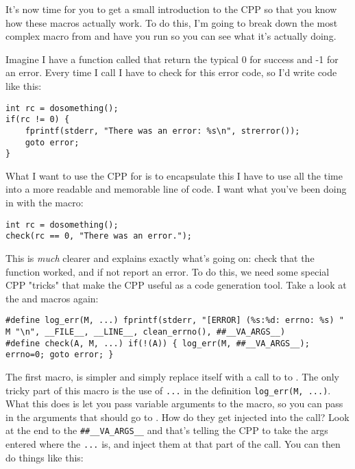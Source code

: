 It's now time for you to get a small introduction to the CPP so that you
know how these macros actually work.  To do this, I'm going to break down
the most complex macro from  and have you run  so
you can see what it's actually doing.

Imagine I have a function called  that return the typical
0 for success and -1 for an error.  Every time I call  I have
to check for this error code, so I'd write code like this:

\begin{lstlisting}
int rc = dosomething();
if(rc != 0) {
    fprintf(stderr, "There was an error: %s\n", strerror());
    goto error;
}
\end{lstlisting}

What I want to use the CPP for is to encapsulate this  I have
to use all the time into a more readable and memorable line of code.  I want
what you've been doing in  with the  macro:

\begin{lstlisting}
int rc = dosomething();
check(rc == 0, "There was an error.");
\end{lstlisting}

This is \emph{much} clearer and explains exactly what's going on: check that the 
function worked, and if not report an error.  To do this, we need some special
CPP "tricks" that make the CPP useful as a code generation tool.  Take a look
at the  and  macros again:

\begin{lstlisting}
#define log_err(M, ...) fprintf(stderr, "[ERROR] (%s:%d: errno: %s) " M "\n", __FILE__, __LINE__, clean_errno(), ##__VA_ARGS__)
#define check(A, M, ...) if(!(A)) { log_err(M, ##__VA_ARGS__); errno=0; goto error; }
\end{lstlisting}

The first macro,  is simpler and simply replace itself with a
call to  to .  The only tricky part of this macro
is the use of \verb|...| in the definition \verb|log_err(M, ...)|.  What this
does is let you pass variable arguments to the macro, so you can pass in the
arguments that should go to .  How do they get injected into the
 call?  Look at the end to the \verb|##__VA_ARGS__| and
that's telling the CPP to take the args entered where the \verb|...| is, and
inject them at that part of the  call.  You can then do things
like this:

